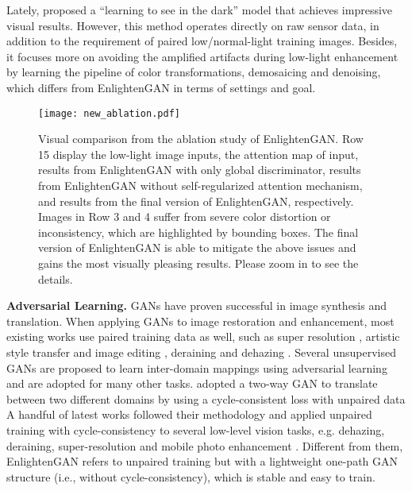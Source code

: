 \documentclass[journal]{IEEEtran}
\begin{document}
Lately, \cite{chen2018learning} proposed a ``learning to see in the dark'' model that achieves impressive visual results. However, this method operates directly on
raw sensor data, in addition to the requirement of paired low/normal-light training images. Besides, it focuses more on avoiding the amplified artifacts during low-light enhancement by learning the pipeline of color transformations, demosaicing and denoising, which differs from EnlightenGAN in terms of settings and goal. 


\begin{figure*}[!t]
\centering
\texttt{[image: new\_ablation.pdf]}
\caption{Visual comparison from the ablation study of EnlightenGAN. Row 15 display the low-light image inputs, the attention map of input, results from EnlightenGAN with only global discriminator, results from EnlightenGAN without self-regularized attention mechanism, and results from the final version of EnlightenGAN, respectively. Images in Row 3 and 4 suffer from severe color distortion or inconsistency, which are highlighted by bounding boxes. The final version of EnlightenGAN is able to mitigate the above issues and gains the most visually pleasing results. Please zoom in to see the details.}
\label{fig:ablation}
\end{figure*}
















\noindent \textbf{Adversarial Learning.}  
GANs \cite{goodfellow2014generative,gong2019autogan} have proven successful in image synthesis and translation. 
When applying GANs to image restoration and enhancement, most existing works use paired training data as well, such as super resolution \cite{ledig2017photo}, artistic style transfer and image editing \cite{yang2019controllable,yang2020deep}, deraining \cite{qian2018attentive} and dehazing \cite{li2018single}. Several unsupervised GANs are proposed to learn inter-domain mappings using adversarial learning and are adopted for many other tasks. \cite{zhu2017unpaired,liu2017unsupervised} adopted a two-way GAN to translate between two different domains by using a cycle-consistent loss with unpaired data
A handful of latest works followed their methodology and applied unpaired training with cycle-consistency to several low-level vision tasks, e.g. dehazing, deraining, super-resolution and mobile photo enhancement  \cite{yang2018towards,yuan122018unsupervised,chen2018deep,jin2018unsupervised}. Different from them, EnlightenGAN refers to unpaired training but with a lightweight one-path GAN structure (i.e., without cycle-consistency), which is stable and easy to train.
\end{document}
